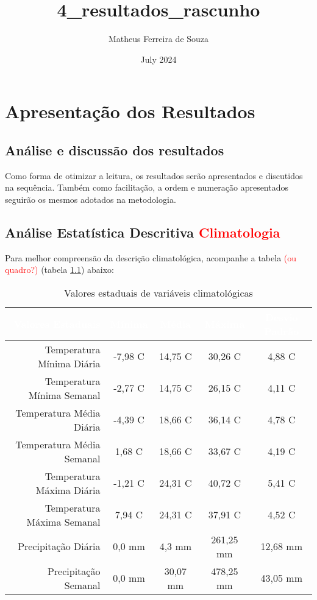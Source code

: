 \documentclass[
	12pt,				%
	openright,			%
	oneside,			%
	a4paper,			%
	english,			%
	french,				%
	spanish,			%
	brazil				%
	dvipsnames, table]{abntex2}
\title{4_resultados_rascunho}
\author{Matheus Ferreira de Souza}
\date{July 2024}
\begin{document}
\maketitle

\newpage

\chapter{Apresentação dos Resultados}

\section{Análise e discussão dos resultados}

\indent Como forma de otimizar a leitura, os resultados serão apresentados e discutidos na sequência. Também como facilitação, a ordem e numeração apresentados seguirão os mesmos adotados na metodologia.

\section{Análise Estatística Descritiva \textcolor{red}{Climatologia}}

\indent Para melhor compreensão da descrição climatológica, acompanhe a tabela \textcolor{red}{(ou quadro?)} (tabela \ref{tab:valores_climato}) abaixo:

\begin{table}[htbp]
    \centering
    \caption{Valores estaduais de variáveis climatológicas}
    {
    \begin{tabular}{r|cccc}
    \hline
    \toprule
    \rowcolor{darkgray} \textcolor{white}{Valores Estaduais} & \textcolor{white}{Mínima} & \textcolor{white}{Média} & \textcolor{white}{Máxima} & \textcolor{white}{Desvio Padrão}\\
    \midrule
    Temperatura Mínima Diária & -7,98 C & 14,75 C& 30,26 C & 4,88 C\\
    Temperatura Mínima Semanal & -2,77 C & 14,75 C & 26,15 C & 4,11 C\\
    Temperatura Média Diária & -4,39 C & 18,66 C & 36,14 C & 4,78 C\\
    Temperatura Média Semanal & 1,68 C & 18,66 C & 33,67 C & 4,19 C\\
    Temperatura Máxima Diária & -1,21 C & 24,31 C & 40,72 C & 5,41 C\\
    Temperatura Máxima Semanal & 7,94 C & 24,31 C & 37,91 C & 4,52 C\\ 
    Precipitação Diária & 0,0 mm & 4,3 mm & 261,25 mm & 12,68 mm\\
    Precipitação Semanal & 0,0 mm & 30,07 mm & 478,25 mm & 43,05 mm\\
    \bottomrule
    \end{tabular}}
    \label{tab:valores_climato}
\end{table}
\end{document}
